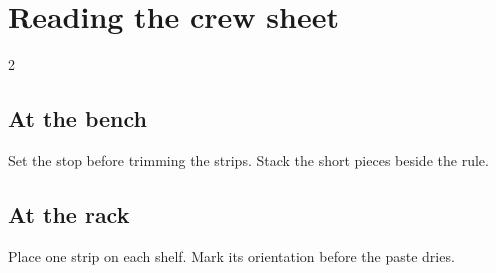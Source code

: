 \documentclass{article}
\begin{document}
\section*{Reading the crew sheet}

\begin{multicols}{2}\subsection*{At the bench}
Set the stop before trimming the strips. Stack the short pieces beside the rule.
\columnbreak\subsection*{At the rack}
Place one strip on each shelf. Mark its orientation before the paste dries.
\end{multicols}
\end{document}
